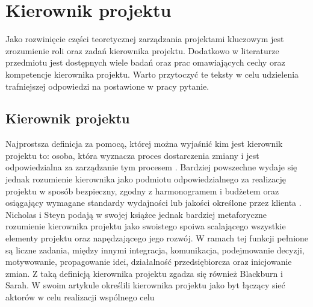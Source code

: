 \newpage
\section{Kierownik projektu}
Jako rozwinięcie części teoretycznej zarządzania projektami kluczowym jest zrozumienie roli oraz zadań kierownika projektu. Dodatkowo w literaturze przedmiotu jest dostępnych wiele badań oraz prac omawiających cechy oraz kompetencje kierownika projektu. Warto przytoczyć te teksty w celu udzielenia trafniejszej odpowiedzi na postawione w pracy pytanie.

\subsection{Kierownik projektu}
Najprostsza definicja za pomocą, której można wyjaśnić kim jest kierownik projektu to: osoba, która wyznacza proces dostarczenia zmiany i jest odpowiedzialna za zarządzanie tym procesem \autocite{Turner2016}.
Bardziej powszechne wydaje się jednak rozumienie kierownika jako podmiotu odpowiedzialnego za realizację projektu w sposób bezpieczny, zgodny z harmonogramem i budżetem oraz osiągający wymagane standardy wydajności lub jakości określone przez klienta \autocite{Sommerville}.
Nicholas i Steyn podają w swojej książce jednak bardziej metaforyczne rozumienie kierownika projektu jako swoistego spoiwa scalającego wszystkie elementy projektu oraz napędzającego jego rozwój. W ramach tej funkcji pełnione są liczne zadania, między innymi integracja, komunikacja, podejmowanie decyzji, motywowanie, propagowanie idei, działalność przedsiębiorcza oraz inicjowanie zmian. \autocite{NicholasSteyn}
Z taką definicją kierownika projektu zgadza się również Blackburn i Sarah. W swoim artykule określili kierownika projektu jako byt łączący sieć aktorów w celu realizacji wspólnego celu \autocite{BlackburnSarah}

